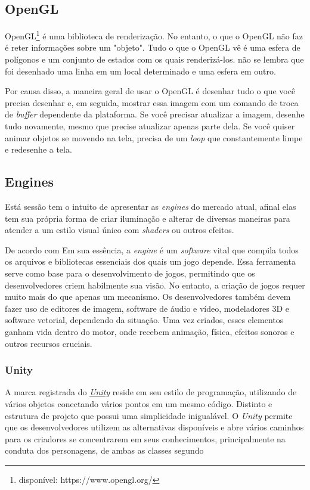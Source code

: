 \subsection{OpenGL}
OpenGL\footnote{disponível: https://www.opengl.org/} é uma biblioteca de renderização. No entanto, o que o OpenGL não faz é reter informações sobre um "objeto". Tudo o que o OpenGL vê é uma esfera de polígonos e um conjunto de estados com os quais renderizá-los. não se lembra que foi desenhado uma linha em um local determinado e uma esfera em outro.

Por causa disso, a maneira geral de usar o OpenGL é desenhar tudo o que você precisa desenhar e, em seguida, mostrar essa imagem com um comando de troca de \textit{buffer} dependente da plataforma. Se você precisar atualizar a imagem, desenhe tudo novamente, mesmo que precise atualizar apenas parte dela. Se você quiser animar objetos se movendo na tela, precisa de um \textit{loop} que constantemente limpe e redesenhe a tela.

\subsection{Engines}

Está sessão tem o intuito de apresentar as \textit{engines} do mercado atual, afinal elas tem sua própria forma de criar iluminação e alterar de diversas maneiras para atender a um estilo visual único com \textit{shaders} ou outros efeitos.

De acordo com \cite{Felipe2017-av} Em sua essência, a \textit{engine} é um \textit{software}  vital que compila todos os arquivos e bibliotecas essenciais dos quais um jogo depende. Essa ferramenta serve como base para o desenvolvimento de jogos, permitindo que os desenvolvedores criem habilmente sua visão.  No entanto, a criação de jogos requer muito mais do que apenas um mecanismo.  Os desenvolvedores também devem fazer uso de editores de imagem, software de áudio e vídeo, modeladores 3D e software vetorial, dependendo da situação.  Uma vez criados, esses elementos ganham vida dentro do motor, onde recebem animação, física, efeitos sonoros e outros recursos cruciais.

\subsubsection{Unity}
A marca registrada do \href{https://unity.com/pt}{\textit{Unity}} reside em seu estilo de programação, utilizando de vários objetos conectando vários pontos em um mesmo código. Distinto e estrutura de projeto que possui uma simplicidade inigualável.  O \textit{Unity} permite que os desenvolvedores utilizem as alternativas disponíveis e abre vários caminhos para os criadores se concentrarem em seus conhecimentos, principalmente na conduta dos personagens, de ambas as classes segundo \cite{Henrique2014-ka}

